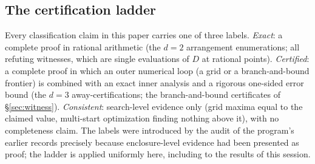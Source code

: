 \subsection{The certification ladder}

Every classification claim in this paper carries one of three labels.
\emph{Exact}: a complete proof in rational arithmetic (the $d=2$
arrangement enumerations; all refuting witnesses, which are single
evaluations of $D$ at rational points). \emph{Certified}: a complete
proof in which an outer numerical loop (a grid or a branch-and-bound
frontier) is combined with an exact inner analysis and a rigorous
one-sided error bound (the $d=3$ away-certifications; the
branch-and-bound certificates of \S\ref{sec:witness}). \emph{Consistent}:
search-level evidence only (grid maxima equal to the claimed value,
multi-start optimization finding nothing above it), with no completeness
claim. The labels were introduced by the audit of the program's earlier
records precisely because enclosure-level evidence had been presented as
proof; the ladder is applied uniformly here, including to the results of
this session.
